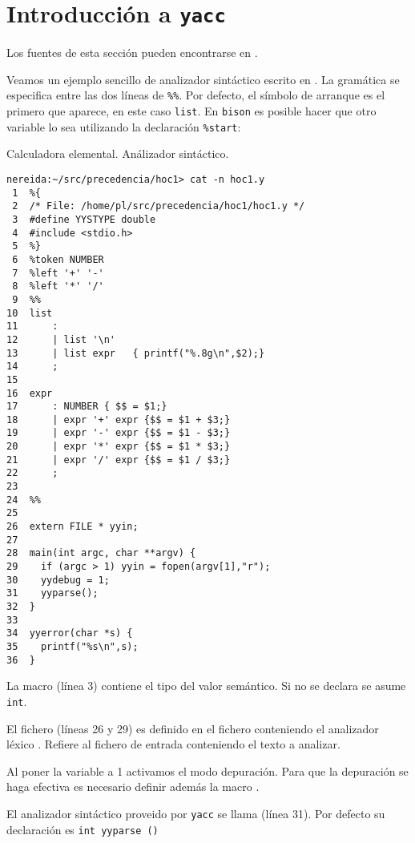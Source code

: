 \section{Introducción a {\tt yacc}}
\label{section:introyacc}
Los fuentes de esta sección pueden encontrarse en
.


Veamos un ejemplo sencillo de analizador sintáctico escrito en .
La gramática se especifica entre las dos líneas de \verb|%%|. 
Por defecto, el símbolo de arranque es el primero que aparece, en este caso
\verb|list|. En \verb|bison| es posible hacer que otro variable lo sea
utilizando la declaración \verb|%start|:


\begin{program} Calculadora elemental. Análizador sintáctico.
\label{prog:calc1}
\begin{verbatim}
nereida:~/src/precedencia/hoc1> cat -n hoc1.y
 1  %{
 2  /* File: /home/pl/src/precedencia/hoc1/hoc1.y */
 3  #define YYSTYPE double
 4  #include <stdio.h>
 5  %}
 6  %token NUMBER
 7  %left '+' '-'
 8  %left '*' '/'
 9  %%
10  list
11      :
12      | list '\n'
13      | list expr   { printf("%.8g\n",$2);}
14      ;
15
16  expr
17      : NUMBER { $$ = $1;}
18      | expr '+' expr {$$ = $1 + $3;}
19      | expr '-' expr {$$ = $1 - $3;}
20      | expr '*' expr {$$ = $1 * $3;}
21      | expr '/' expr {$$ = $1 / $3;}
22      ;
23
24  %%
25
26  extern FILE * yyin;
27
28  main(int argc, char **argv) {
29    if (argc > 1) yyin = fopen(argv[1],"r");
30    yydebug = 1;
31    yyparse();
32  }
33
34  yyerror(char *s) {
35    printf("%s\n",s);
36  }
\end{verbatim}
\end{program}
La macro  (línea 3) contiene el tipo del valor semántico.
Si no se declara se asume \verb|int|.

El fichero  (líneas 26 y 29) es definido en el 
fichero conteniendo el analizador léxico 
. Refiere al fichero de entrada conteniendo
el texto a analizar.

Al poner la variable  a 1 activamos el modo depuración.
Para que la depuración se haga efectiva es necesario definir además
la macro .

El analizador sintáctico proveido por \verb|yacc| se llama  
(línea 31). Por defecto su declaración es \verb|int yyparse ()|


